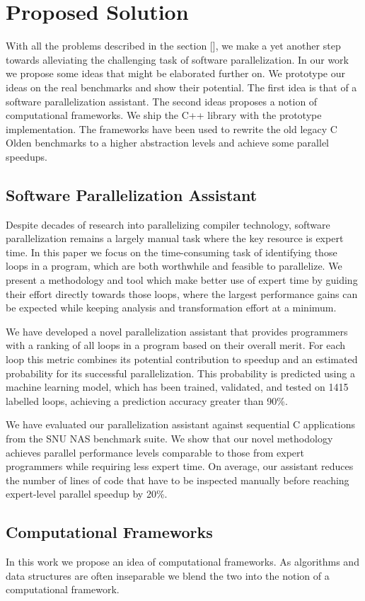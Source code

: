\section{Proposed Solution}
\quad With all the problems described in the section [], we make a yet another step towards alleviating the challenging task of software parallelization. In our work we propose some ideas that might be elaborated further on. We prototype our ideas on the real benchmarks and show their potential. The first idea is that of a software parallelization assistant. The second ideas proposes a notion of computational frameworks. We ship the C++ library with the prototype implementation. The frameworks have been used to rewrite the old legacy C Olden benchmarks to a higher abstraction levels and achieve some parallel speedups.

\subsection{Software Parallelization Assistant}
\quad Despite decades of research into parallelizing compiler technology, software parallelization remains a largely manual task where the key resource is expert time. In this paper we focus on the time-consuming task of identifying those loops in a program, which are both worthwhile and feasible to parallelize. We present a methodology and tool which make better use of expert time by guiding their effort directly towards those loops, where the largest performance gains can be expected while keeping analysis and transformation effort at a minimum.
  
We have developed a novel parallelization assistant that provides programmers with a ranking of all loops in a program based on their overall merit. For each loop this metric combines its potential contribution to speedup and an estimated probability for its successful parallelization. This probability is predicted using a machine learning model, which has been trained, validated, and tested on 1415 labelled loops, achieving a prediction accuracy greater than 90\%.
  
We have evaluated our parallelization assistant against sequential C applications from the SNU NAS benchmark suite. We show that our novel methodology achieves parallel performance levels comparable to those from expert programmers while requiring less expert time. On average, our assistant reduces the number of lines of code that have to be inspected manually before reaching expert-level parallel speedup by 20\%. %

\subsection{Computational Frameworks}
\quad In this work we propose an idea of computational frameworks. As algorithms and data structures are often inseparable we blend the two into the notion of a computational framework.  
